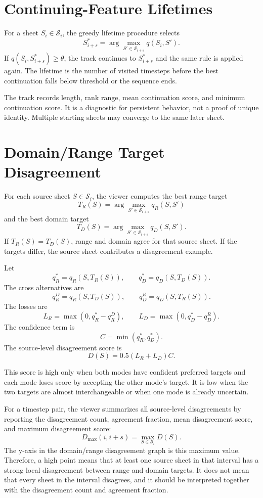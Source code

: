 \documentclass{vgtc}
\newcommand{\Sheets}{\mathcal{S}}
\newcommand{\Sheet}{S}
\begin{document}
\section{Continuing-Feature Lifetimes}

For a sheet $\Sheet_i\in\Sheets_i$, the greedy lifetime procedure selects
$$
\Sheet_{i+s}^\ast=\arg\max_{\Sheet'\in\Sheets_{i+s}}q(\Sheet_i,\Sheet').
$$
If $q(\Sheet_i,\Sheet_{i+s}^\ast)\geq\theta$, the track continues to $\Sheet_{i+s}^\ast$ and the same rule is applied again. The lifetime is the number of visited timesteps before the best continuation falls below threshold or the sequence ends.

The track records length, rank range, mean continuation score, and minimum continuation score. It is a diagnostic for persistent behavior, not a proof of unique identity. Multiple starting sheets may converge to the same later sheet.

\section{Domain/Range Target Disagreement}

For each source sheet $\Sheet\in\Sheets_i$, the viewer computes the best range target
$$
T_R(\Sheet)=\arg\max_{\Sheet'\in\Sheets_{i+s}}q_R(\Sheet,\Sheet')
$$
and the best domain target
$$
T_D(\Sheet)=\arg\max_{\Sheet'\in\Sheets_{i+s}}q_D(\Sheet,\Sheet').
$$
If $T_R(\Sheet)=T_D(\Sheet)$, range and domain agree for that source sheet. If the targets differ, the source sheet contributes a disagreement example.

Let
$$
q_R^\ast=q_R(\Sheet,T_R(\Sheet)),
\qquad
q_D^\ast=q_D(\Sheet,T_D(\Sheet)).
$$
The cross alternatives are
$$
q_R^D=q_R(\Sheet,T_D(\Sheet)),
\qquad
q_D^R=q_D(\Sheet,T_R(\Sheet)).
$$
The losses are
$$
L_R=\max(0,q_R^\ast-q_R^D),
\qquad
L_D=\max(0,q_D^\ast-q_D^R).
$$
The confidence term is
$$
C=\min(q_R^\ast,q_D^\ast).
$$
The source-level disagreement score is
$$
D(\Sheet)=0.5(L_R+L_D)C.
$$

This score is high only when both modes have confident preferred targets and each mode loses score by accepting the other mode's target. It is low when the two targets are almost interchangeable or when one mode is already uncertain.

For a timestep pair, the viewer summarizes all source-level disagreements by reporting the disagreement count, agreement fraction, mean disagreement score, and maximum disagreement score:
$$
D_\mathrm{max}(i,i+s)=\max_{\Sheet\in\Sheets_i}D(\Sheet).
$$
The y-axis in the domain/range disagreement graph is this maximum value. Therefore, a high point means that at least one source sheet in that interval has a strong local disagreement between range and domain targets. It does not mean that every sheet in the interval disagrees, and it should be interpreted together with the disagreement count and agreement fraction.
\end{document}
